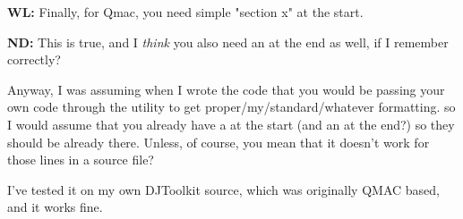 \textbf{WL:} Finally, for Qmac, you need simple "section x" at the start. 

\textbf{ND:} This is true, and I \emph{think} you also need an  at the end as well, if I remember correctly?

Anyway, I was assuming when I wrote the code that you would be passing your own code through the utility to get proper/my/standard/whatever formatting. so I would assume that you already have a  at the start (and an  at the end?) so they should be already there. Unless, of course, you mean that it doesn't work for those lines in a source file?

I've tested it on my own DJToolkit source, which was originally QMAC based, and it works fine.

